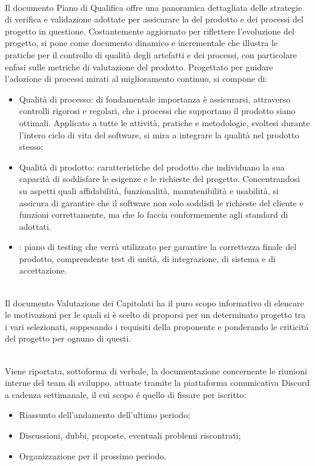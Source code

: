 \\
Il documento Piano di Qualifica offre una panoramica dettagliata delle strategie di verifica e validazione adottate per assicurare la  del prodotto e dei processi del progetto in questione. Costantemente aggiornato per riflettere l'evoluzione del progetto, si pone come documento dinamico e incrementale che illustra le pratiche per il controllo di qualità degli artefatti e dei processi, con particolare enfasi sulle metriche di valutazione del prodotto. Progettato per guidare l'adozione di processi mirati al miglioramento continuo, si compone di:
\begin{itemize}
    \item Qualità di processo: di fondamentale importanza è assicurarsi, attraverso controlli rigorosi e regolari, che i processi che supportano il prodotto siano ottimali. Applicato a tutte le attività, pratiche e metodologie, svoltesi durante l'intero ciclo di vita del software, si mira a integrare la qualità nel prodotto stesso;
    \item Qualità di prodotto: caratteristiche del prodotto che individuano la sua capacità di soddisfare le esigenze e le richieste del progetto. Concentrandosi su aspetti quali affidabilità, funzionalità, manutenibilità e usabilità, si assicura di garantire che il software non solo soddisfi le richieste del cliente e funzioni correttamente, ma che lo faccia conformemente agli standard di  adottati.
    \item {}: piano di testing che verrà utilizzato per garantire la correttezza finale del prodotto, comprendente test di unità, di integrazione, di sistema e di accettazione.
\end{itemize} 

\\
Il documento Valutazione dei Capitolati ha il puro scopo informativo di elencare le motivazioni per le quali si è scelto di proporsi per un determinato progetto tra i vari selezionati, soppesando i requisiti della proponente e ponderando le criticitá del progetto per ognuno di questi.  

\\
Viene riportata, sottoforma di verbale, la documentazione concernente le riunioni interne del team di sviluppo, attuate tramite la piattaforma comunicativa Discord a cadenza settimanale, il cui scopo é quello di fissare per iscritto:
\begin{itemize}
    \item Riassunto dell'andamento dell'ultimo periodo;
    \item Discussioni, dubbi, proposte, eventuali problemi riscontrati;
    \item Organizzazione per il prossimo periodo.
\end{itemize}

